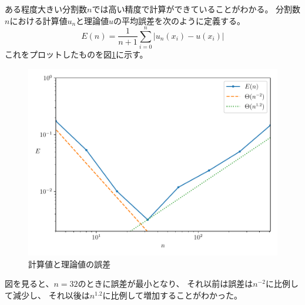 \documentclass[a4j, titlepage]{jsarticle}
\numberwithin{equation}{section}
\begin{document}
                ある程度大きい分割数$n$では高い精度で計算ができていることがわかる。
                分割数$n$における計算値$u_n$と理論値$u$の平均誤差を次のように定義する。
                \begin{equation*}
                    E(n) = \frac{1}{n+1}\sum_{i=0}^n|u_n(x_i)-u(x_i)|
                \end{equation*}
                これをプロットしたものを図\ref{fig:femdiff}に示す。
                \begin{figure}[h]
                    \centering
                    \includegraphics[width=0.8\hsize]{kadai4/diff.pdf}
                    \caption{計算値と理論値の誤差}
                    \label{fig:femdiff}
                \end{figure}
                図を見ると、$n=32$のときに誤差が最小となり、
                それ以前は誤差は$n^{-2}$に比例して減少し、
                それ以後は$n^{1.2}$に比例して増加することがわかった。
        
\newpage
{}
\begin{thebibliography}{99}
\end{thebibliography}
\end{document}
